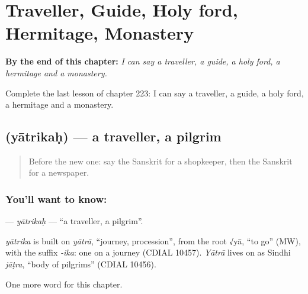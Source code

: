 
\chapter{Traveller, Guide, Holy ford, Hermitage, Monastery}
\label{ch:sa-traveller-guide-holy-ford-hermitage-monastery}

\begin{chapteropening}
\textbf{By the end of this chapter:} \emph{I can say a traveller, a guide, a holy ford, a hermitage and a monastery.}

Complete the last lesson of chapter 223: I can say a traveller, a guide, a holy ford, a hermitage and a monastery.
\end{chapteropening}

\section[\texorpdfstring{\sk{यात्रिकः} (yātrikaḥ)}{यात्रिकः (yātrikaḥ)}]{ (yātrikaḥ) — a traveller, a pilgrim}

\label{lesson:SA-C223-yatrikah}



\begin{quote}
Before the new one: say the Sanskrit for a shopkeeper, then the Sanskrit for a newspaper.
\end{quote}

\subsection*{You'll want to know: }
\textbf{} — \emph{yātrikaḥ} — \textquotedblleft{}a traveller, a pilgrim\textquotedblright{}.

\begin{cousinweb}
\emph{yātrika} is built on \emph{yātrā}, \textquotedblleft{}journey, procession\textquotedblright{}, from the root √yā, \textquotedblleft{}to go\textquotedblright{} (MW), with the suffix \emph{-ika}: one on a journey (CDIAL 10457). \emph{Yātrā} lives on as Sindhi \emph{jāṭra}, \textquotedblleft{}body of pilgrims\textquotedblright{} (CDIAL 10456).
\end{cousinweb}

\begin{grammarlens}[title={What you've built}]
One more word for this chapter.
\end{grammarlens}

